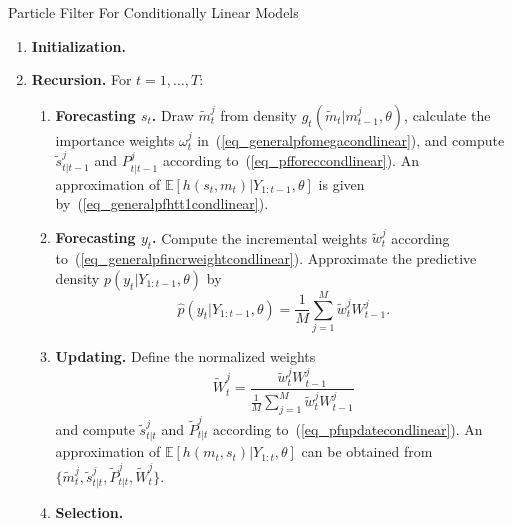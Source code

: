 \documentclass[presentation]{beamer}
\newcommand{\be}{\begin{equation}}
\newcommand{\ee}{\end{equation}}
\begin{document}
\begin{frame}[label={sec:org879d9c1}]{Particle Filter For Conditionally Linear Models}
\begin{enumerate}
	\item {\bf Initialization.} 

	\item {\bf Recursion.} For $t=1,\ldots,T$:
	\begin{enumerate}
		\item {\bf Forecasting $s_t$.} Draw $\tilde{m}_t^j$ from density $g_t(\tilde{m}_t|m_{t-1}^j,\theta)$,
		calculate the importance weights $\omega_t^j$ in~(\ref{eq_generalpfomegacondlinear}),
		and compute $\tilde{s}_{t|t-1}^j$ and $P_{t|t-1}^j$ according to~(\ref{eq_pfforeccondlinear}).
		An approximation of $\mathbb{E}[h(s_t,m_t)|Y_{1:t-1},\theta]$ is given by~(\ref{eq_generalpfhtt1condlinear}).
		\item {\bf Forecasting $y_t$.} Compute the incremental weights $\tilde{w}_t^j$
		according to~(\ref{eq_generalpfincrweightcondlinear}).
		Approximate the predictive density $p(y_t|Y_{1:t-1},\theta)$
    by
		\be
		\hat{p}(y_t|Y_{1:t-1},\theta) = \frac{1}{M} \sum_{j=1}^M \tilde{w}^j_t W_{t-1}^j.
		\ee
		\item {\bf Updating.} Define the normalized weights
		\be
		\tilde{W}_t^j = \frac{\tilde{w}_t^j W_{t-1}^j}{\frac{1}{M} \sum_{j=1}^M \tilde{w}_t^j W_{t-1}^j}
		\ee
		and compute $\tilde{s}_{t|t}^j$ and $\tilde{P}_{t|t}^j$ according to~(\ref{eq_pfupdatecondlinear}). An approximation of $\mathbb{E}[h(m_{t},s_{t})|Y_{1:t},\theta]$ can be obtained
		from $\{\tilde{m}_t^j,\tilde{s}_{t|t}^j,\tilde{P}_{t|t}^j,\tilde{W}_t^j\}$.
		\item {\bf Selection.} 
	\end{enumerate}
\end{enumerate}
\end{frame}
\end{document}
